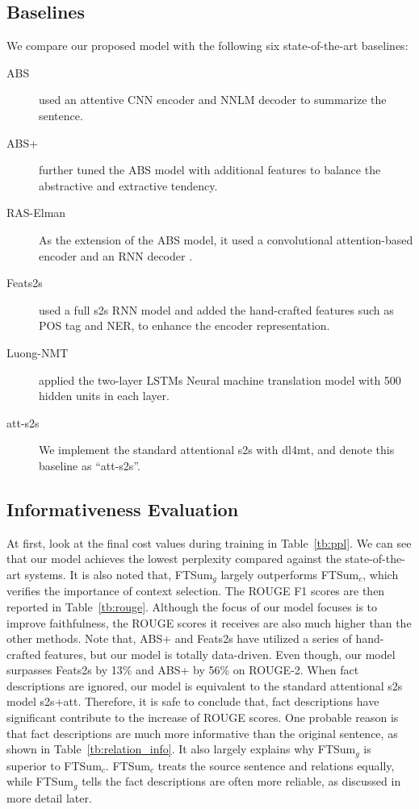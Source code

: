 \documentclass[letterpaper]{article} %
\begin{document}
	
	\subsection{Baselines}
	We compare our proposed model with the following six state-of-the-art baselines:
	\begin{description}
		\item[ABS] \cite{rush2015neural} used an attentive CNN encoder and NNLM decoder to summarize the sentence.
		\item[ABS+] \cite{rush2015neural}
		further tuned the ABS model with additional features to balance
		the abstractive and extractive tendency.
		\item[RAS-Elman] As the extension of the ABS model, it used a convolutional attention-based encoder and an RNN decoder \cite{chopra2016abstractive}.
		\item[Feats2s]  \cite{nallapati2016abstractive} used a full
		s2s RNN model and added the hand-crafted features such as POS tag and NER, to enhance the encoder representation.
		\item[Luong-NMT] \cite{luong2015effective} applied the two-layer LSTMs Neural machine translation model with 500 hidden
		units in each layer.
		\item[att-s2s] We implement the standard attentional s2s with dl4mt, and denote this baseline as ``att-s2s''.
	\end{description}
	
	\subsection{Informativeness Evaluation}
	At first, look at the final cost values during training in Table~\ref{tb:ppl}.
	We can see that our model achieves the lowest perplexity compared against the state-of-the-art systems.
	It is also noted that, FTSum$_g$ largely outperforms FTSum$_c$, which verifies the importance of context selection.
	The ROUGE F1 scores are then reported in Table~\ref{tb:rouge}.
	Although the focus of our model focuses is to improve faithfulness, the ROUGE scores it receives are also much higher than the other methods.
	Note that, ABS+ and Feats2s have utilized a series of hand-crafted features, but our model is totally data-driven.
	Even though, our model surpasses Feats2s by 13\% and ABS+ by 56\% on ROUGE-2.
	When fact descriptions are ignored, our model is equivalent to the standard attentional s2s model s2s+att.
	Therefore, it is safe to conclude that, fact descriptions have significant contribute to the increase of ROUGE scores.
	One probable reason is that fact descriptions are much more informative than the original sentence, as shown in Table~\ref{tb:relation_info}.
	It also largely explains why FTSum$_g$ is superior to FTSum$_c$.
	FTSum$_c$ treats the source sentence and relations equally, while FTSum$_g$ tells the fact descriptions are often more reliable, as discussed in more detail later.
	
\end{document}
